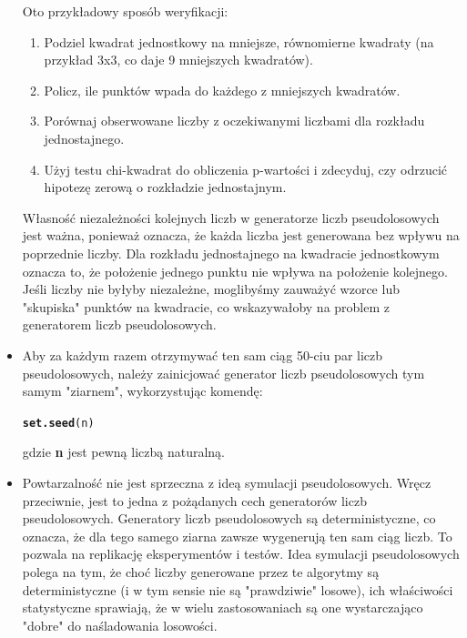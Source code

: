 \documentclass[12pt, a4paper]{article}\usepackage[]{graphicx}\usepackage[]{xcolor}
\makeatletter
\newcommand{\hlstd}[1]{\textcolor[rgb]{0.345,0.345,0.345}{#1}}%
\newcommand{\hlkwd}[1]{\textcolor[rgb]{0.737,0.353,0.396}{\textbf{#1}}}%
\newenvironment{kframe}{%
 \def\at@end@of@kframe{}%
 \ifinner\ifhmode%
  \def\at@end@of@kframe{\end{minipage}}%
  \begin{minipage}{\columnwidth}%
 \fi\fi%
 \def\FrameCommand##1{\hskip\@totalleftmargin \hskip-\fboxsep
 \colorbox{shadecolor}{##1}\hskip-\fboxsep
     \hskip-\linewidth \hskip-\@totalleftmargin \hskip\columnwidth}%
 \MakeFramed {\advance\hsize-\width
   \@totalleftmargin\z@ \linewidth\hsize
   \@setminipage}}%
 {\par\unskip\endMakeFramed%
 \at@end@of@kframe}
\newenvironment{knitrout}{}{} %
\makeatother
\begin{document}
\begin{itemize}
Oto przykładowy sposób weryfikacji:
\begin{enumerate}
  \item Podziel kwadrat jednostkowy na mniejsze, równomierne kwadraty (na przykład 3x3, co daje 9 mniejszych kwadratów).
  \item Policz, ile punktów wpada do każdego z mniejszych kwadratów.
  \item Porównaj obserwowane liczby z oczekiwanymi liczbami dla rozkładu jednostajnego.
  \item Użyj testu chi-kwadrat do obliczenia p-wartości i zdecyduj, czy odrzucić hipotezę zerową o rozkładzie jednostajnym.
\end{enumerate}

Własność niezależności kolejnych liczb w generatorze liczb pseudolosowych jest ważna, ponieważ oznacza, że każda liczba jest generowana bez wpływu na poprzednie liczby. Dla rozkładu jednostajnego na kwadracie jednostkowym oznacza to, że położenie jednego punktu nie wpływa na położenie kolejnego. Jeśli liczby nie byłyby niezależne, moglibyśmy zauważyć wzorce lub "skupiska" punktów na kwadracie, co wskazywałoby na problem z generatorem liczb pseudolosowych.


\break

\item
Aby za każdym razem otrzymywać ten sam ciąg 50-ciu par liczb pseudolosowych, należy zainicjować generator liczb pseudolosowych tym samym "ziarnem", wykorzystując komendę:
\begin{knitrout}
\color{fgcolor}\begin{kframe}
\begin{alltt}
\hlkwd{set.seed}\hlstd{(n)}
\end{alltt}
\end{kframe}
\end{knitrout}
gdzie \textbf{n} jest pewną liczbą naturalną.

\item
Powtarzalność nie jest sprzeczna z ideą symulacji pseudolosowych. Wręcz przeciwnie, jest to jedna z pożądanych cech generatorów liczb pseudolosowych. Generatory liczb pseudolosowych są deterministyczne, co oznacza, że dla tego samego ziarna zawsze wygenerują ten sam ciąg liczb. To pozwala na replikację eksperymentów i testów.
Idea symulacji pseudolosowych polega na tym, że choć liczby generowane przez te algorytmy są deterministyczne (i w tym sensie nie są "prawdziwie" losowe), ich właściwości statystyczne sprawiają, że w wielu zastosowaniach są one wystarczająco "dobre" do naśladowania losowości.

\end{itemize}
\end{document}
